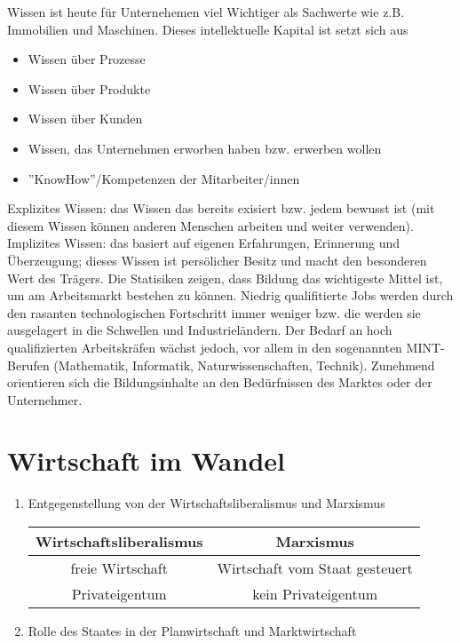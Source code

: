 \documentclass[a4paper]{report}
\begin{document}
Wissen ist heute für Unternehemen viel Wichtiger als Sachwerte wie z.B. Immobilien und Maschinen. Dieses intellektuelle Kapital ist setzt sich aus

\begin{itemize}
\item Wissen über Prozesse
\item Wissen über Produkte
\item Wissen über Kunden
\item Wissen, das Unternehmen erworben haben bzw. erwerben wollen
\item ''KnowHow''/Kompetenzen der Mitarbeiter/innen
\end{itemize}

Explizites Wissen: das Wissen das bereits exisiert bzw. jedem bewusst ist (mit diesem Wissen können anderen Menschen arbeiten und weiter verwenden).
\newline
\newline 
Implizites Wissen: das basiert auf eigenen Erfahrungen, Erinnerung und Überzeugung; dieses Wissen ist persölicher Besitz und macht den besonderen Wert des Trägers.
\newline
\newline
Die Statisiken zeigen, dass Bildung das wichtigeste Mittel ist, um am Arbeitsmarkt bestehen zu können. Niedrig qualifitierte Jobs werden durch den rasanten technologischen Fortschritt immer weniger bzw. die werden sie ausgelagert in die Schwellen und Industrieländern. Der Bedarf an hoch qualifizierten Arbeitskräfen wächst jedoch, vor allem in den sogenannten MINT-Berufen (Mathematik, Informatik, Naturwissenschaften, Technik). Zunehmend orientieren sich die Bildungsinhalte an den Bedürfnissen des Marktes oder der Unternehmer.
\newline

\chapter{Wirtschaft im Wandel}

\begin{enumerate}
\item Entgegenstellung von der Wirtschaftsliberalismus und Marxismus

\begin{tabular}{|c|c|}

\hline Wirtschaftsliberalismus & Marxismus
\\\hline freie Wirtschaft & Wirtschaft vom Staat gesteuert
\\Privateigentum & kein Privateigentum
\\\hline
\end{tabular}

\item Rolle des Staates in der Planwirtschaft und Marktwirtschaft

\end{enumerate}
\end{document}

